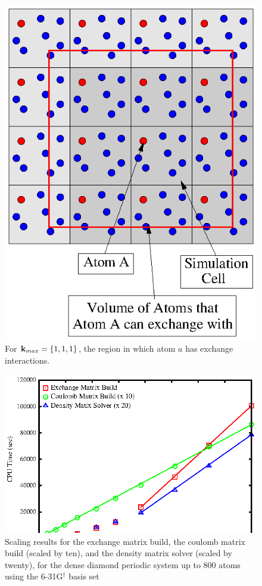 \documentclass[prb,aps,nobibnotes,twocolumn,doublespace,twocolumngrid,superbib]{revtex4}
\begin{document}
\begin{figure}
\caption{For ${\bf k}_{max}=\{1,1,1\}$, the region in which atom $a$ has exchange interactions.}
\label{figure:ExchangeRegion_k111}
{\centering \includegraphics{ExchangeRegion_k111.ps} \par}
\end{figure}
%
%
%
\begin{figure}
\caption{Scaling results for the exchange matrix build, the coulomb matrix
build (scaled by ten), and the density matrix solver (scaled by twenty),  
for the dense diamond periodic system up to 800 atoms using the
6-31G$ ^\dagger$ basis set \cite{}}
\label{figure:Scaling_Matrix_Build}
{\centering \includegraphics{Timing_Diamond_ONX.ps} \par} 
\end{figure}
\end{document}
